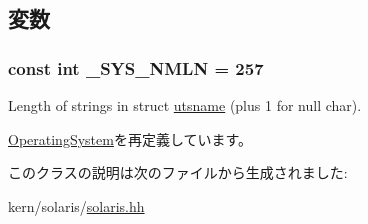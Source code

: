 \subsection{変数}
\hypertarget{classSolaris_a1a19d4c9718c9a4ad5fa2e48271fccc9}{
\subsubsection[{\_\-SYS\_\-NMLN}]{\setlength{\rightskip}{0pt plus 5cm}const int {\bf \_\-SYS\_\-NMLN} = 257}}
\label{classSolaris_a1a19d4c9718c9a4ad5fa2e48271fccc9}


Length of strings in struct \hyperlink{structSolaris_1_1utsname}{utsname} (plus 1 for null char). 

\hyperlink{classOperatingSystem_a1a19d4c9718c9a4ad5fa2e48271fccc9}{OperatingSystem}を再定義しています。

このクラスの説明は次のファイルから生成されました:\begin{DoxyCompactItemize}
\item 
kern/solaris/\hyperlink{kern_2solaris_2solaris_8hh}{solaris.hh}\end{DoxyCompactItemize}
